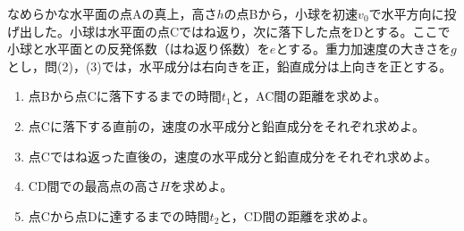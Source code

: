 \hakosyokika
\item
    \begin{mawarikomi}{150pt}{}
        なめらかな水平面の点Aの真上，高さ$h$の点Bから，小球を初速$v_0$で水平方向に投げ出した。小球は水平面の点Cではね返り，次に落下した点をDとする。ここで小球と水平面との反発係数（はね返り係数）を$e$とする。重力加速度の大きさを$g$とし，問(2)，(3)では，水平成分は右向きを正，鉛直成分は上向きを正とする。
        \begin{enumerate}
            \item 点Bから点Cに落下するまでの時間$t_1$と，AC間の距離を求めよ。
            \item 点Cに落下する直前の，速度の水平成分と鉛直成分をそれぞれ求めよ。
            \item 点Cではね返った直後の，速度の水平成分と鉛直成分をそれぞれ求めよ。
            \item CD間での最高点の高さ$H$を求めよ。
            \item 点Cから点Dに達するまでの時間$t_2$と，CD間の距離を求めよ。
        \end{enumerate}
    \end{mawarikomi}